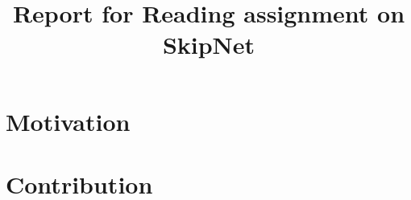 \documentclass{article}
\title{Report for Reading assignment on SkipNet}
\begin{document}
\maketitle

\section{Motivation}

\section{Contribution}
\end{document}
